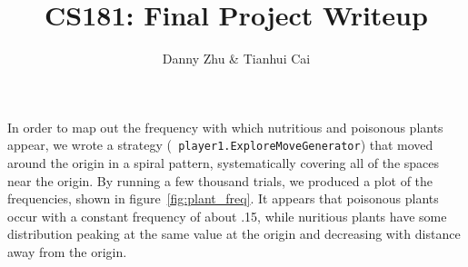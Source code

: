 \documentclass{article}
\title{CS181: Final Project Writeup}
\author{Danny Zhu \& Tianhui Cai}
\begin{document}
\maketitle

In order to map out the frequency with which nutritious and poisonous
plants appear, we wrote a strategy ({\tt
  player1.ExploreMoveGenerator}) that moved around the origin in a
spiral pattern, systematically covering all of the spaces near the
origin. By running a few thousand trials, we produced a plot of the
frequencies, shown in figure~\ref{fig:plant_freq}. It appears that
poisonous plants occur with a constant frequency of about .15, while
nuritious plants have some distribution peaking at the same value at
the origin and decreasing with distance away from the origin.
\end{document}
